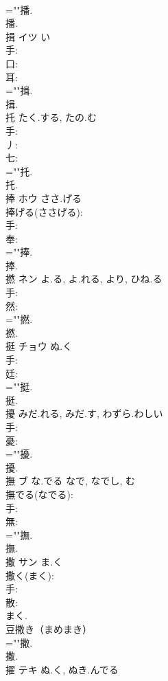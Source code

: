 \documentclass[8pt]{extreport}
\begin{document}
\begin{CJK}{UTF8}{min}
\\	=""播.
\\	播.
\\	揖	イツ		い	
\\	手: 
\\	口: 
\\	耳: 
\\	=""揖.
\\	揖.
\\	托		たく.する, たの.む				
\\	手: 
\\	丿: 
\\	七: 
\\	=""托.
\\	托.
\\	捧	ホウ	ささ.げる		
\\	捧げる(ささげる): 
\\	手: 
\\	奉: 
\\	=""捧.
\\	捧.
\\	撚	ネン	よ.る, よ.れる, より, ひね.る		
\\	手: 
\\	然: 
\\	=""撚.
\\	撚.
\\	挺	チョウ	ぬ.く		
\\	手: 
\\	廷: 
\\	=""挺.
\\	挺.
\\	擾		みだ.れる, みだ.す, わずら.わしい				
\\	手: 
\\	憂: 
\\	=""擾.
\\	擾.
\\	撫	ブ	な.でる	なで, なでし, む	
\\	撫でる(なでる): 
\\	手: 
\\	無: 
\\	=""撫.
\\	撫.
\\	撒	サン	ま.く		
\\	撒く(まく): 
\\	手: 
\\	散: 
\\	まく.	
\\	豆撒き（まめまき） 
\\	=""撒.
\\	撒.
\\	擢	テキ	ぬ.く, ぬき.んでる		

\end{CJK}
\end{document}

